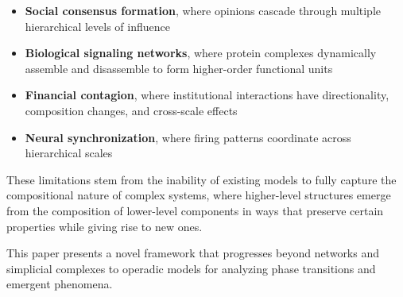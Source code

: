 \begin{itemize}[leftmargin=*]
  \item \textbf{Social consensus formation}, where opinions cascade through multiple hierarchical levels of influence \citep{watts1998collective}
  \item \textbf{Biological signaling networks}, where protein complexes dynamically assemble and disassemble to form higher-order functional units \citep{strogatz2001exploring, giovannoni2017dynamic}
  \item \textbf{Financial contagion}, where institutional interactions have directionality, composition changes, and cross-scale effects \citep{farmer2009economy}
  \item \textbf{Neural synchronization}, where firing patterns coordinate across hierarchical scales \citep{bar2008dynamics, linde2021operad}
\end{itemize}

These limitations stem from the inability of existing models to fully capture the compositional nature of complex systems, where higher-level structures emerge from the composition of lower-level components in ways that preserve certain properties while giving rise to new ones.

This paper presents a novel framework that progresses beyond networks and simplicial complexes to operadic models for analyzing phase transitions and emergent phenomena.
